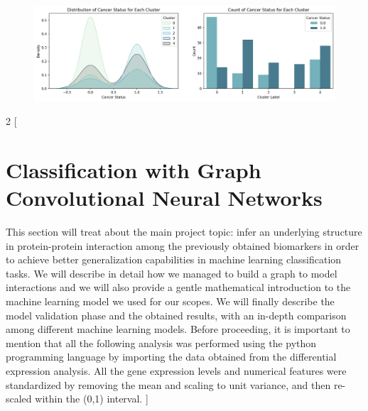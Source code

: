 \documentclass{article}
\begin{document}
\begin{figure}[!t]
    \centering
    \includegraphics[width=\linewidth]{assets/hist.png} 
    \label{fig:hist}
\end{figure}
\newpage
\begin{multicols}{2}
[
\section{Classification with Graph Convolutional Neural Networks}
\label{sec:3} 
This section will treat about the main project topic: infer an underlying structure in protein-protein interaction among the previously obtained biomarkers in order to achieve better generalization capabilities in machine learning classification tasks. We will describe in detail how we managed to build a graph to model interactions and we will also provide a gentle mathematical introduction to the machine learning model we used for our scopes. We will finally describe the model validation phase and the obtained results, with an in-depth comparison among different machine learning models. Before proceeding, it is important to mention that all the following analysis was performed using the python programming language by importing the data obtained from the differential expression analysis. All the gene expression levels and numerical features were standardized by removing the mean and scaling to unit variance, and then re-scaled within the (0,1) interval.
]

\end{multicols}
\end{document}

